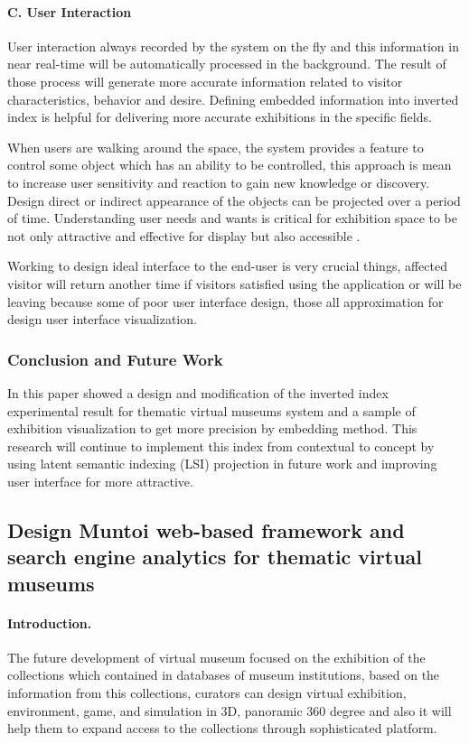 \paragraph{C. User Interaction}
User interaction always recorded by the system on the fly and this information in near real-time will be automatically processed in the background. The result of those process will generate more accurate information related to visitor characteristics, behavior and desire. Defining embedded information into inverted index is helpful for delivering more accurate exhibitions in the specific fields.

When users are walking around the space, the system provides a feature to control some object which has an ability to be controlled, this approach is mean to increase user sensitivity and reaction to gain new knowledge or discovery. Design direct or indirect appearance of the objects can be projected over a period of time. Understanding user needs and wants is critical for exhibition space to be not only attractive and effective for display but also accessible \cite{LordPiacente}.

Working to design ideal interface to the end-user is very crucial things, affected visitor will return another time if visitors satisfied using the application or will be leaving because some of poor user interface design, those all approximation for design user interface visualization.

\subsubsection{Conclusion and Future Work}
In this paper showed a design and modification of the inverted index experimental result for thematic virtual museums system and a sample of exhibition visualization to get more precision by embedding method. This research will continue to implement this index from contextual to concept by using latent semantic indexing (LSI) projection in future work and improving user interface for more attractive.

\subsection{Design Muntoi web-based framework and search engine analytics for thematic virtual museums}\label{subsec:ch4/sec2/sub3}

\paragraph{Introduction.} The future development of virtual museum focused on the exhibition of the collections which contained in databases of museum institutions, based on the information from this collections, curators can design virtual exhibition, environment, game, and simulation in 3D, panoramic 360 degree and also it will help them to expand access to the collections through sophisticated platform.

